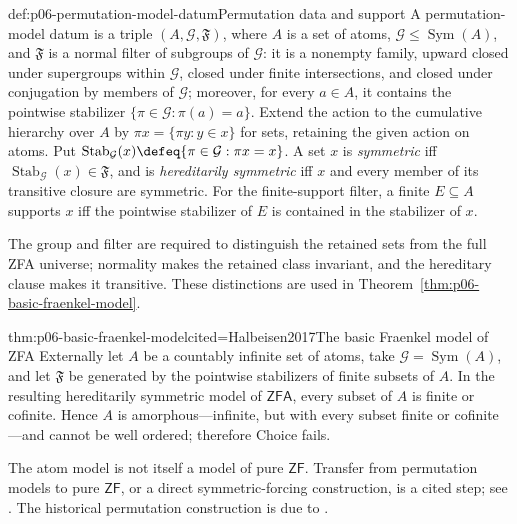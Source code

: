 \begin{hbdefinition}{def:p06-permutation-model-datum}{Permutation data and support}
A permutation-model datum is a triple \((A,\mathcal G,\mathfrak F)\), where
\(A\) is a set of atoms, \(\mathcal G\leq\operatorname{Sym}(A)\), and
\(\mathfrak F\) is a normal filter of subgroups of \(\mathcal G\): it is a
nonempty family, upward closed under supergroups within \(\mathcal G\), closed
under finite intersections, and closed under conjugation by members of
\(\mathcal G\); moreover, for every \(a\in A\), it contains the pointwise
  stabilizer \(\{\pi\in\mathcal G:\pi(a)=a\}\).  Extend the action to the
  cumulative hierarchy over \(A\) by
\(\pi x=\{\pi y:y\in x\}\) for sets, retaining the given action on atoms.  Put
\(\operatorname{Stab}_{\mathcal G}(x)
 \defeq\{\pi\in\mathcal G:\pi x=x\}\).  A set \(x\) is
\emph{symmetric} iff \(\operatorname{Stab}_{\mathcal G}(x)\in\mathfrak F\), and is
\emph{hereditarily symmetric} iff \(x\) and every member of its transitive
closure are symmetric.  For the finite-support filter, a finite
\(E\subseteq A\) supports
\(x\) iff the pointwise stabilizer of \(E\) is contained in the stabilizer of
\(x\).

The group and filter are required to distinguish the retained sets from the
full ZFA universe; normality makes the retained class invariant, and the
hereditary clause makes it transitive.  These distinctions are used in
Theorem~\ref{thm:p06-basic-fraenkel-model}.
\end{hbdefinition}

\begin{hbtheorem}{thm:p06-basic-fraenkel-model}{cited=Halbeisen2017}{The basic Fraenkel model of ZFA}
Externally let \(A\) be a countably infinite set of atoms, take
\(\mathcal G=\operatorname{Sym}(A)\), and let \(\mathfrak F\) be generated by
the pointwise stabilizers of finite subsets of \(A\).  In the resulting
hereditarily symmetric model of \(\mathsf{ZFA}\), every subset of \(A\) is
finite or cofinite.  Hence \(A\) is amorphous---infinite, but with every subset
finite or cofinite---and cannot be well ordered; therefore Choice fails.
\end{hbtheorem}

The atom model is not itself a model of pure \(\mathsf{ZF}\).  Transfer from
permutation models to pure \(\mathsf{ZF}\), or a direct symmetric-forcing
construction, is a cited step; see \textcite{Jech1973Choice,Halbeisen2017}.
The historical permutation construction is due to \textcite{Fraenkel1922}.

